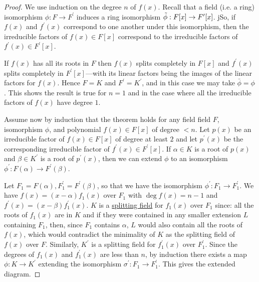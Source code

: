   \begin{proof}
    We use induction on the degree $n$ of $f(x)$. Recall that a field (i.e. a ring) isomorphism $\phi: F \to F^\prime$ induces a ring isomorphism $\Tilde{\phi}: F[x] \to F^\prime [x]$. jSo, if $f(x)$ and $f^\prime (x)$ correspond to one another under this isomorphism, then the irreducible factors of $f(x) \in F[x]$ correspond to the irreducible factors of $f^\prime (x) \in F^\prime [x]$. 

    If $f(x)$ has all its roots in $F$ then $f(x)$ splits completely in $F[x]$ and $f^\prime (x)$ splits completely in $F^\prime [x]$---with its linear factors being the images of the linear factors for $f(x)$. Hence $F = K$ and $F^\prime = K^\prime$, and in this case we may take $\bar{\phi} = \phi$. This shows the result is true for $n = 1$ and in the case where all the irreducible factors of $f(x)$ have degree $1$. 

    Assume now by induction that the theorem holds for any field field $F$, isomorphism $\phi$, and polynomial $f(x) \in F[x]$ of degree $< n$. Let $p(x)$ be an irreducible factor of $f(x) \in F[x]$ of degree at least $2$ and let $p^\prime (x)$ be the corresponding irreducible factor of $f^\prime (x) \in F^\prime [x]$. If $\alpha \in K$ is a root of $p(x)$ and $\beta \in K^\prime$ is a root of $p^\prime (x)$, then we can extend $\phi$ to an isomorphism $\phi^\prime: F(\alpha) \to F^\prime (\beta)$. 

    \begin{figure}[H]
      \centering 
    \end{figure}

    Let $F_1 = F(\alpha), F_1^\prime = F^\prime (\beta)$, so that we have the isomorphism $\phi^\prime :F_1 \to F_1^\prime$. We have $f(x) = (x - \alpha) f_1 (x)$ over $F_1$ with $\deg{f(x)} = n-1$ and $f^\prime (x) = (x - \beta) f_1^\prime(x)$. $K$ is a \hyperref[def:splitting-field]{splitting field} for $f_1 (x)$ over $F_1$ since: all the roots of $f_1 (x)$ are in $K$ and if they were contained in any smaller extension $L$ containing $F_1$, then, since $F_1$ contains $\alpha$, $L$ would also contain all the roots of $f(x)$, which would contradict the minimality of $K$ as the splitting field of $f(x)$ over $F$. Similarly, $K^\prime$ is a splitting field for $f_1^\prime (x)$ over $F_1^\prime$. Since the degrees of $f_1 (x)$ and $f_1^\prime (x)$ are less than $n$, by induction there exists a map $\phi: K \to K^\prime$ extending the isomorphism $\sigma^\prime: F_1 \to F_1^\prime$. This gives the extended diagram. 


\end{proof}
